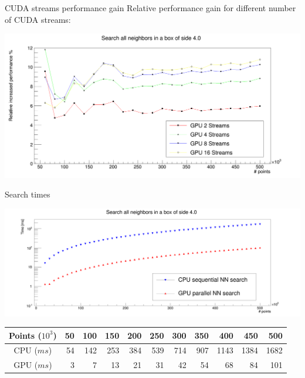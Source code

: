 \documentclass{beamer}
\newenvironment{changemargin}[2]{%
  \begin{list}{}{%
    \setlength{\topsep}{0pt}%
    \setlength{\leftmargin}{#1}%
    \setlength{\rightmargin}{#2}%
    \setlength{\listparindent}{\parindent}%
    \setlength{\itemindent}{\parindent}%
    \setlength{\parsep}{\parskip}%
  }%
  \item[]}{\end{list}}
\begin{document}
\begin{frame}{CUDA streams performance gain}
Relative performance gain for different number of CUDA streams:\\
\begin{changemargin}{-1cm}{-1cm}
\begin{center}
\includegraphics[scale=0.19]{images/fkdStreams.png}
\end{center}
\end{changemargin}
\end{frame}

\begin{frame}{Search times}
\begin{changemargin}{-1cm}{-1cm}
\begin{center}
\includegraphics[scale=0.15]{images/fkdSearchTimes.png}
\end{center}
\begin{table}[h]
\begin{tabular}{ c || r r r r r r r r r r }
Points ($10^{3}$) & 50 & 100 & 150 & 200 & 250 & 300 & 350 & 400 & 450 & 500 \\
\hline
CPU ($\unit{ms}$) & 54 & 142 & 253 & 384 & 539 & 714 & 907 & 1143 & 1384 & 1682 \\
GPU ($\unit{ms}$) & 3 & 7 & 13 & 21 & 31 & 42 & 54 & 68 & 84 & 101 \\
\end{tabular}
\end{table}
\end{changemargin}
\end{frame}
\end{document}
